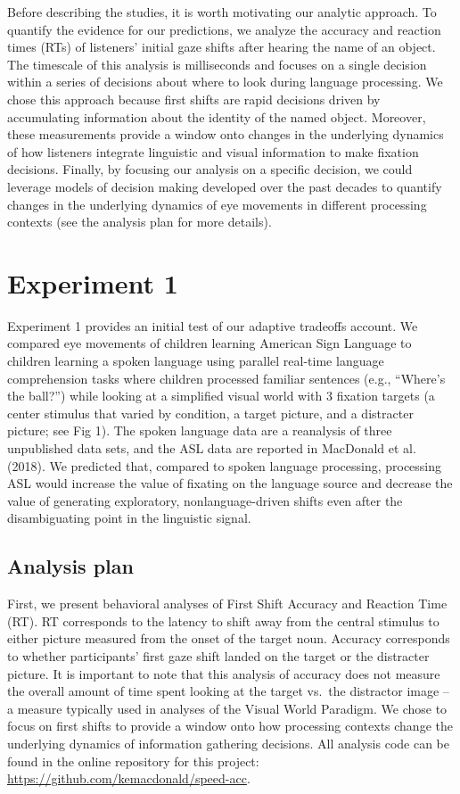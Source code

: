 \documentclass[english,floatsintext,man]{apa6}
\begin{document}
Before describing the studies, it is worth motivating our analytic
approach. To quantify the evidence for our predictions, we analyze the
accuracy and reaction times (RTs) of listeners' initial gaze shifts
after hearing the name of an object. The timescale of this analysis is
milliseconds and focuses on a single decision within a series of
decisions about where to look during language processing. We chose this
approach because first shifts are rapid decisions driven by accumulating
information about the identity of the named object. Moreover, these
measurements provide a window onto changes in the underlying dynamics of
how listeners integrate linguistic and visual information to make
fixation decisions. Finally, by focusing our analysis on a specific
decision, we could leverage models of decision making developed over the
past decades to quantify changes in the underlying dynamics of eye
movements in different processing contexts (see the analysis plan for
more details).

\hypertarget{experiment-1}{%
\section{Experiment 1}\label{experiment-1}}

Experiment 1 provides an initial test of our adaptive tradeoffs account.
We compared eye movements of children learning American Sign Language to
children learning a spoken language using parallel real-time language
comprehension tasks where children processed familiar sentences (e.g.,
\enquote{Where's the ball?}) while looking at a simplified visual world
with 3 fixation targets (a center stimulus that varied by condition, a
target picture, and a distracter picture; see Fig 1). The spoken
language data are a reanalysis of three unpublished data sets, and the
ASL data are reported in MacDonald et al. (2018). We predicted that,
compared to spoken language processing, processing ASL would increase
the value of fixating on the language source and decrease the value of
generating exploratory, nonlanguage-driven shifts even after the
disambiguating point in the linguistic signal.

\hypertarget{analysis-plan}{%
\subsection{Analysis plan}\label{analysis-plan}}

First, we present behavioral analyses of First Shift Accuracy and
Reaction Time (RT). RT corresponds to the latency to shift away from the
central stimulus to either picture measured from the onset of the target
noun. Accuracy corresponds to whether participants' first gaze shift
landed on the target or the distracter picture. It is important to note
that this analysis of accuracy does not measure the overall amount of
time spent looking at the target vs.~the distractor image -- a measure
typically used in analyses of the Visual World Paradigm. We chose to
focus on first shifts to provide a window onto how processing contexts
change the underlying dynamics of information gathering decisions. All
analysis code can be found in the online repository for this project:
\url{https://github.com/kemacdonald/speed-acc}.
\end{document}
